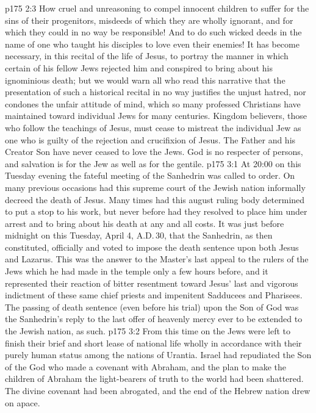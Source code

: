 \vs p175 2:3 How cruel and unreasoning to compel innocent children to suffer for the sins of their progenitors, misdeeds of which they are wholly ignorant, and for which they could in no way be responsible! And to do such wicked deeds in the name of one who taught his disciples to love even their enemies! It has become necessary, in this recital of the life of Jesus, to portray the manner in which certain of his fellow Jews rejected him and conspired to bring about his ignominious death; but we would warn all who read this narrative that the presentation of such a historical recital in no way justifies the unjust hatred, nor condones the unfair attitude of mind, which so many professed Christians have maintained toward individual Jews for many centuries. Kingdom believers, those who follow the teachings of Jesus, must cease to mistreat the individual Jew as one who is guilty of the rejection and crucifixion of Jesus. The Father and his Creator Son have never ceased to love the Jews. God is no respecter of persons, and salvation is for the Jew as well as for the gentile.
\vs p175 3:1 At 20:00 on this Tuesday evening the fateful meeting of the Sanhedrin was called to order. On many previous occasions had this supreme court of the Jewish nation informally decreed the death of Jesus. Many times had this august ruling body determined to put a stop to his work, but never before had they resolved to place him under arrest and to bring about his death at any and all costs. It was just before midnight on this Tuesday, April 4, A.D.\,30, that the Sanhedrin, as then constituted, officially and  voted to impose the death sentence upon both Jesus and Lazarus. This was the answer to the Master’s last appeal to the rulers of the Jews which he had made in the temple only a few hours before, and it represented their reaction of bitter resentment toward Jesus’ last and vigorous indictment of these same chief priests and impenitent Sadducees and Pharisees. The passing of death sentence (even before his trial) upon the Son of God was the Sanhedrin’s reply to the last offer of heavenly mercy ever to be extended to the Jewish nation, as such.
\vs p175 3:2 From this time on the Jews were left to finish their brief and short lease of national life wholly in accordance with their purely human status among the nations of Urantia. Israel had repudiated the Son of the God who made a covenant with Abraham, and the plan to make the children of Abraham the light\hyp{}bearers of truth to the world had been shattered. The divine covenant had been abrogated, and the end of the Hebrew nation drew on apace.
